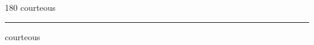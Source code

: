
\begin{frame}
\begin{center}
\begin{turn}{180}
{\fontsize{2.5cm}{1em}\selectfont courteous}
\end{turn}
\vspace{1em}\par  
\hrule
\vspace{1em}\par  
{\fontsize{2.5cm}{1em}\selectfont courteous}
\end{center}
\end{frame}
